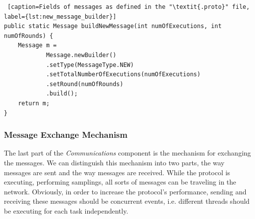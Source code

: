 \documentclass[a4paper,11pt,twoside]{report}
\begin{document}
\lstset{
 language = Java,
  numbers=none,
  stepnumber=1,    
  firstnumber=1,
  numberfirstline=true
}
\begin{lstlisting} [caption=Fields of messages as defined in the "\textit{.proto}" file, label={lst:new_message_builder}]
public static Message buildNewMessage(int numOfExecutions, int numOfRounds) {
	Message m =
			Message.newBuilder()
			.setType(MessageType.NEW)
			.setTotalNumberOfExecutions(numOfExecutions)
			.setRound(numOfRounds)
			.build();
	return m;
}
\end{lstlisting}

\subsubsection*{Message Exchange Mechanism}

The last part of the \textit{Communications} component is the mechanism for exchanging the messages. We can distinguish this mechanism into two parts, the way messages are sent and the way messages are received. While the protocol is executing, performing samplings, all sorts of messages can be traveling in the network. Obviously, in order to increase the protocol's performance, sending and receiving these messages should be concurrent events, i.e. different threads should be executing for each task independently.\\
\end{document}
